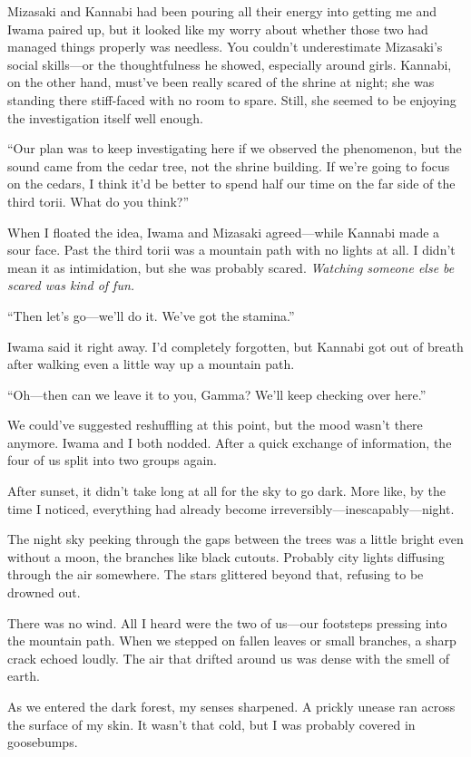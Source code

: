 \documentclass[
    a4paper,
    12pt,
    twoside,
    openany,
    UTF8,
    fontset=windows
]{ctexbook}
\begin{document}
Mizasaki and Kannabi had been pouring all their energy into getting me and Iwama paired up, but it looked like my worry about whether those two had managed things properly was needless. You couldn't underestimate Mizasaki's social skills---or the thoughtfulness he showed, especially around girls. Kannabi, on the other hand, must've been really scared of the shrine at night; she was standing there stiff-faced with no room to spare. Still, she seemed to be enjoying the investigation itself well enough.

``Our plan was to keep investigating here if we observed the phenomenon, but the sound came from the cedar tree, not the shrine building. If we're going to focus on the cedars, I think it'd be better to spend half our time on the far side of the third torii. What do you think?''

When I floated the idea, Iwama and Mizasaki agreed---while Kannabi made a sour face. Past the third torii was a mountain path with no lights at all. I didn't mean it as intimidation, but she was probably scared. \textit{Watching someone else be scared was kind of fun.}

``Then let's go---we'll do it. We've got the stamina.''

Iwama said it right away. I'd completely forgotten, but Kannabi got out of breath after walking even a little way up a mountain path.

``Oh---then can we leave it to you, Gamma? We'll keep checking over here.''

We could've suggested reshuffling at this point, but the mood wasn't there anymore. Iwama and I both nodded. After a quick exchange of information, the four of us split into two groups again.

After sunset, it didn't take long at all for the sky to go dark. More like, by the time I noticed, everything had already become irreversibly---inescapably---night.

The night sky peeking through the gaps between the trees was a little bright even without a moon, the branches like black cutouts. Probably city lights diffusing through the air somewhere. The stars glittered beyond that, refusing to be drowned out.

There was no wind. All I heard were the two of us---our footsteps pressing into the mountain path. When we stepped on fallen leaves or small branches, a sharp crack echoed loudly. The air that drifted around us was dense with the smell of earth.

As we entered the dark forest, my senses sharpened. A prickly unease ran across the surface of my skin. It wasn't that cold, but I was probably covered in goosebumps.
\end{document}
